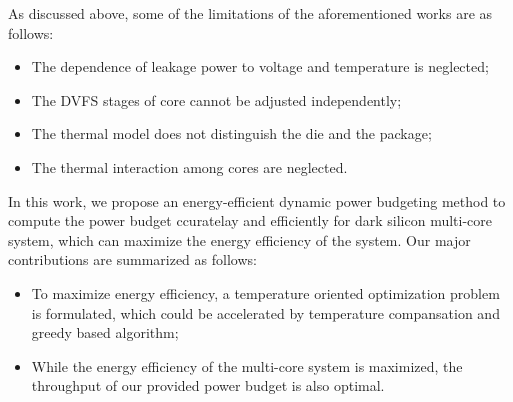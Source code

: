 As discussed above, some of the limitations of the aforementioned works are as follows:
\begin{itemize}  
\item The dependence of leakage power to voltage and temperature is neglected;
\item The DVFS stages of core cannot be adjusted independently;
\item The thermal model does not distinguish the die and the package;
\item The thermal interaction among cores are neglected.
\end{itemize} 

In this work, we propose an energy-efficient dynamic power budgeting method to compute the power budget ccuratelay and efficiently for dark silicon multi-core system, which can maximize the energy efficiency of the system. Our major contributions are summarized as follows:
\begin{itemize}  
\item To maximize energy efficiency, a temperature oriented optimization problem is formulated, which could be accelerated by temperature compansation and greedy based algorithm;
\item While the energy efficiency of the multi-core system is maximized, the throughput of our provided power budget is also optimal.
\end{itemize} 